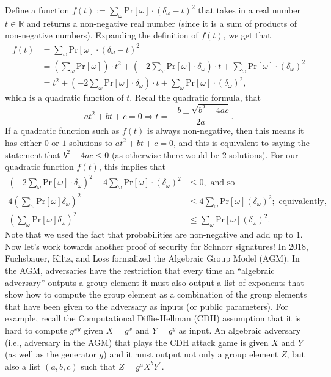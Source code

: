 \documentclass[12pt]{article}
\newcommand{\pr}[1]{\text{Pr}\left[#1\right]}
\theoremstyle{definition}
\theoremstyle{remark}
\theoremstyle{definition}
\begin{document}
Define a function $f(t) := \sum_\omega \pr{\omega}\cdot (\delta_\omega - t)^2$ that takes in a real number $t\in\mathbb{R}$ and returns a non-negative real number (since it is a sum of products of non-negative numbers). Expanding the definition of $f(t)$, we get that
\begin{align*}
f(t) &= \sum_\omega \pr{\omega}\cdot (\delta_\omega - t)^2\\
&= \left(\sum_\omega \pr{\omega}\right)\cdot t^2 + \left(-2\sum_\omega\pr{\omega}\cdot\delta_\omega\right)\cdot t + \sum_\omega\pr{\omega}\cdot(\delta_\omega)^2\\
& = t^2 + \left(-2\sum_\omega\pr{\omega}\cdot\delta_\omega\right)\cdot t + \sum_\omega\pr{\omega}\cdot(\delta_\omega)^2,
\end{align*}
which is a quadratic function of $t$. Recal the quadratic formula, that $$at^2 + bt + c = 0\Rightarrow t = \frac{-b\pm\sqrt{b^2 - 4ac}}{2a}.$$ If a quadratic function such as $f(t)$ is always non-negative, then this means it has either $0$ or $1$ solutions to $at^2 + bt + c = 0$, and this is equivalent to saying the statement that $b^2 - 4ac\leq 0$ (as otherwise there would be $2$ solutions). For our quadratic function $f(t)$, this implies that
\begin{align*}
\left(-2\sum_\omega\pr{\omega}\cdot\delta_\omega\right)^2 - 4\sum_\omega\pr{\omega}\cdot(\delta_\omega)^2&\leq 0,\text{ and so}\\
4\left(\sum_\omega\pr{\omega}\delta_\omega\right)^2&\leq 4\sum_\omega\pr{\omega}(\delta_\omega)^2;\text{ equivalently,}\\
\left(\sum_\omega\pr{\omega}\delta_\omega\right)^2&\leq \sum_\omega\pr{\omega}(\delta_\omega)^2.
\end{align*}
Note that we used the fact that probabilities are non-negative and add up to $1$.\\

Now let's work towards another proof of security for Schnorr signatures! In 2018, Fuchsbauer, Kiltz, and Loss formalized the Algebraic Group Model (AGM). In the AGM, adversaries have the restriction that every time an ``algebraic adversary'' outputs a group element it must also output a list of exponents that show how to compute the group element as a combination of the group elements that have been given to the adversary as inputs (or public parameters). For example, recall the Computational Diffie-Hellman (CDH) assumption that it is hard to compute $g^{xy}$ given $X = g^x$ and $Y = g^y$ as input. An algebraic adversary (i.e., adversary in the AGM) that plays the CDH attack game is given $X$ and $Y$ (as well as the generator $g$) and it must output not only a group element $Z$, but also a list $(a, b, c)$ such that $Z = g^aX^bY^c$.\\
\end{document}
